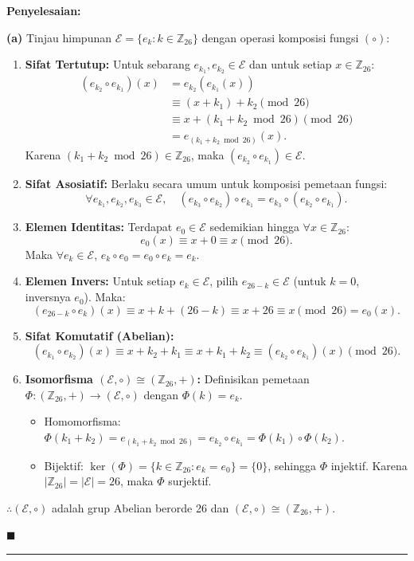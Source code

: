 \documentclass[11pt,a4paper]{article}
\newenvironment{solusi}{\noindent\textbf{\textsf{Penyelesaian:}}\par\vspace{0.2em}}{\hfill$\blacksquare$\vspace{1em}\par\hrule\vspace{1em}}
\begin{document}
\begin{solusi}
\textbf{(a)} Tinjau himpunan $\mathcal{E} = \{e_k : k \in \mathbb{Z}_{26}\}$ dengan operasi komposisi fungsi $(\circ)$:
\begin{enumerate}[leftmargin=*]
    \item \textbf{Sifat Tertutup:} Untuk sebarang $e_{k_1}, e_{k_2} \in \mathcal{E}$ dan untuk setiap $x \in \mathbb{Z}_{26}$:
    \begin{align*}
    (e_{k_2} \circ e_{k_1})(x) &= e_{k_2}(e_{k_1}(x)) \\
    &\equiv (x + k_1) + k_2 \pmod{26} \\
    &\equiv x + (k_1 + k_2 \bmod 26) \pmod{26} \\
    &= e_{(k_1 + k_2 \bmod 26)}(x).
    \end{align*}
    Karena $(k_1 + k_2 \bmod 26) \in \mathbb{Z}_{26}$, maka $(e_{k_2} \circ e_{k_1}) \in \mathcal{E}$.
    
    \item \textbf{Sifat Asosiatif:} Berlaku secara umum untuk komposisi pemetaan fungsi:
    \[
    \forall e_{k_1}, e_{k_2}, e_{k_3} \in \mathcal{E}, \quad (e_{k_3} \circ e_{k_2}) \circ e_{k_1} = e_{k_3} \circ (e_{k_2} \circ e_{k_1}).
    \]
    
    \item \textbf{Elemen Identitas:} Terdapat $e_0 \in \mathcal{E}$ sedemikian hingga $\forall x \in \mathbb{Z}_{26}$:
    \[
    e_0(x) \equiv x + 0 \equiv x \pmod{26}.
    \]
    Maka $\forall e_k \in \mathcal{E}$, $e_k \circ e_0 = e_0 \circ e_k = e_k$.
    
    \item \textbf{Elemen Invers:} Untuk setiap $e_k \in \mathcal{E}$, pilih $e_{26-k} \in \mathcal{E}$ (untuk $k=0$, inversnya $e_0$). Maka:
    \[
    (e_{26-k} \circ e_k)(x) \equiv x + k + (26 - k) \equiv x + 26 \equiv x \pmod{26} = e_0(x).
    \]
    
    \item \textbf{Sifat Komutatif (Abelian):}
    \[
    (e_{k_1} \circ e_{k_2})(x) \equiv x + k_2 + k_1 \equiv x + k_1 + k_2 \equiv (e_{k_2} \circ e_{k_1})(x) \pmod{26}.
    \]
    
    \item \textbf{Isomorfisma $(\mathcal{E}, \circ) \cong (\mathbb{Z}_{26}, +)$:} Definisikan pemetaan $\Phi: (\mathbb{Z}_{26}, +) \to (\mathcal{E}, \circ)$ dengan $\Phi(k) = e_k$.
    \begin{itemize}
        \item Homomorfisma: $\Phi(k_1 + k_2) = e_{(k_1 + k_2 \bmod 26)} = e_{k_2} \circ e_{k_1} = \Phi(k_1) \circ \Phi(k_2)$.
        \item Bijektif: $\ker(\Phi) = \{k \in \mathbb{Z}_{26} : e_k = e_0\} = \{0\}$, sehingga $\Phi$ injektif. Karena $|\mathbb{Z}_{26}| = |\mathcal{E}| = 26$, maka $\Phi$ surjektif.
    \end{itemize}
\end{enumerate}
$\therefore (\mathcal{E}, \circ)$ adalah grup Abelian berorde 26 dan $(\mathcal{E}, \circ) \cong (\mathbb{Z}_{26}, +)$.


\end{solusi}
\end{document}
